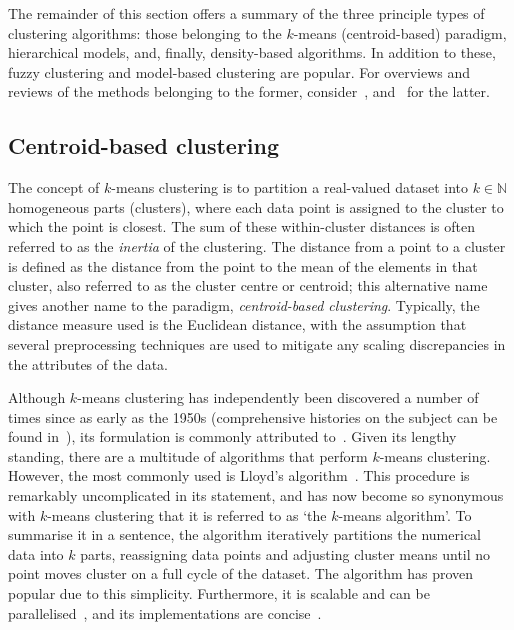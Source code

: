 The remainder of this section offers a summary of the three principle types of
clustering algorithms: those belonging to the \(k\)-means (centroid-based)
paradigm, hierarchical models, and, finally, density-based algorithms. In
addition to these, fuzzy clustering and model-based clustering are popular. For
overviews and reviews of the methods belonging to the former,
consider~\cite{Ferraro2019,Gosain2016,Li2016},
and~\cite{Bouveyron2019,Fruhwirth2019,McNicholas2016} for the latter.

\subsection{Centroid-based clustering}\label{subsec:kmeans}

The concept of \(k\)-means clustering is to partition a
real-valued dataset into \(k \in \mathbb N\) homogeneous parts (clusters), where
each data point is assigned to the cluster to which the point is closest. The
sum of these within-cluster distances is often referred to as the \emph{inertia}
of the clustering. The distance from a point to a cluster is defined as the
distance from the point to the mean of the elements in that cluster, also
referred to as the cluster centre or centroid; this alternative name gives
another name to the paradigm, \emph{centroid-based clustering}. Typically, the
distance measure used is the Euclidean distance, with the assumption that
several preprocessing techniques are used to mitigate any scaling discrepancies
in the attributes of the data.

Although \(k\)-means clustering has independently been discovered a number of
times since as early as the 1950s (comprehensive histories on the subject can be
found in~\cite{Bock2007,Jain2010}), its formulation is commonly attributed
to~\cite{Hartigan1979}. Given its lengthy standing, there are a multitude of
algorithms that perform \(k\)-means clustering. However, the most commonly used
is Lloyd's algorithm~\cite{Lloyd1982}. This procedure is remarkably
uncomplicated in its statement, and has now become so synonymous with
\(k\)-means clustering that it is referred to as `the \(k\)-means algorithm'. To
summarise it in a sentence, the algorithm iteratively partitions the numerical
data into \(k\) parts, reassigning data points and adjusting cluster means until
no point moves cluster on a full cycle of the dataset. The algorithm has proven
popular due to this simplicity. Furthermore, it is scalable and can be
parallelised~\cite{Bahmani2012}, and its implementations are
concise~\cite{Olafsson2008,Wu2009}.

